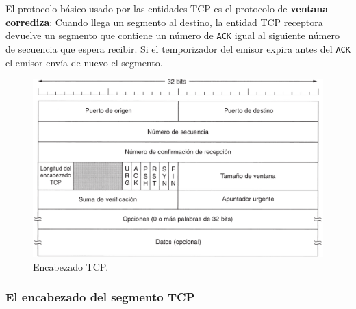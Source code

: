\documentclass[10pt,a4paper]{article}
\begin{document}
El protocolo básico usado por las entidades TCP es el protocolo de \textbf{ventana corrediza}: Cuando llega un segmento al destino, la entidad TCP receptora devuelve un segmento que contiene un número de \texttt{ACK} igual al siguiente número de secuencia que espera recibir. Si el temporizador del emisor expira antes del \texttt{ACK} el emisor envía de nuevo el segmento.

\begin{figure}[ht!]
  \caption{Encabezado TCP.}
  \label{fig:encabezado_TCP}
  \centerline{\includegraphics[width=0.9\textwidth-\fboxrule-\fboxrule]{imgs/encabezado_TCP.png}}
\end{figure}

\subsubsection{El encabezado del segmento TCP}
\end{document}
